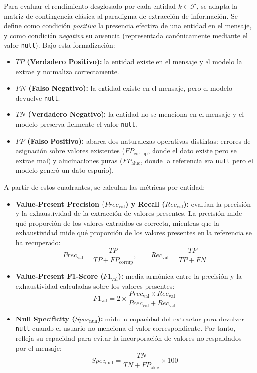 \documentclass[12pt,a4paper]{report}
\begin{document}
Para evaluar el rendimiento desglosado por cada entidad $k \in \mathcal{F}$, se adapta la matriz de contingencia clásica al paradigma de extracción de información. Se define como condición \textit{positiva} la presencia efectiva de una entidad en el mensaje, y como condición \textit{negativa} su ausencia (representada canónicamente mediante el valor \texttt{null}). Bajo esta formalización:

\begin{itemize}
    \item \textbf{$TP$ (Verdadero Positivo):} la entidad existe en el mensaje y el modelo la extrae y normaliza correctamente.
    \item \textbf{$FN$ (Falso Negativo):} la entidad existe en el mensaje, pero el modelo devuelve \texttt{null}.
    \item \textbf{$TN$ (Verdadero Negativo):} la entidad no se menciona en el mensaje y el modelo preserva fielmente el valor \texttt{null}.
    \item \textbf{$FP$ (Falso Positivo):} abarca dos naturalezas operativas distintas: errores de asignación sobre valores existentes ($FP_{\text{corrup}}$, donde el dato existe pero se extrae mal) y alucinaciones puras ($FP_{\text{aluc}}$, donde la referencia era \texttt{null} pero el modelo generó un dato espurio).
\end{itemize}

A partir de estos cuadrantes, se calculan las métricas por entidad:

\begin{itemize}
    \item \textbf{Value-Present Precision ($Prec_{\text{val}}$) y Recall ($Rec_{\text{val}}$):} evalúan la precisión y la exhaustividad de la extracción de valores presentes. La precisión mide qué proporción de los valores extraídos es correcta, mientras que la exhaustividad mide qué proporción de los valores presentes en la referencia se ha recuperado:
    $$Prec_{\text{val}} = \frac{TP}{TP + FP_{\text{corrup}}}, \qquad Rec_{\text{val}} = \frac{TP}{TP + FN}$$

    \item \textbf{Value-Present F1-Score ($F1_{\text{val}}$):} media armónica entre la precisión y la exhaustividad calculadas sobre los valores presentes:
    $$F1_{\text{val}} = 2 \times \frac{Prec_{\text{val}} \times Rec_{\text{val}}}{Prec_{\text{val}} + Rec_{\text{val}}}$$

    \item \textbf{Null Specificity ($Spec_{\text{null}}$):} mide la capacidad del extractor para devolver \texttt{null} cuando el usuario no menciona el valor correspondiente. Por tanto, refleja su capacidad para evitar la incorporación de valores no respaldados por el mensaje:
    $$Spec_{\text{null}} = \frac{TN}{TN + FP_{\text{aluc}}} \times 100$$
\end{itemize}
\end{document}
